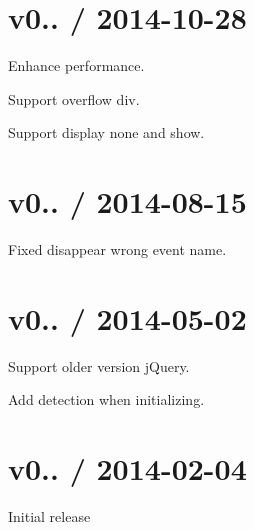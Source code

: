 \section*{v0.. / 2014-\/10-\/28}


\begin{DoxyItemize}
\item Enhance performance.
\item Support overflow div.
\item Support display none and show.
\end{DoxyItemize}

\section*{v0.. / 2014-\/08-\/15}


\begin{DoxyItemize}
\item Fixed disappear wrong event name.
\end{DoxyItemize}

\section*{v0.. / 2014-\/05-\/02}


\begin{DoxyItemize}
\item Support older version j\+Query.
\item Add detection when initializing.
\end{DoxyItemize}

\section*{v0.. / 2014-\/02-\/04}

Initial release 